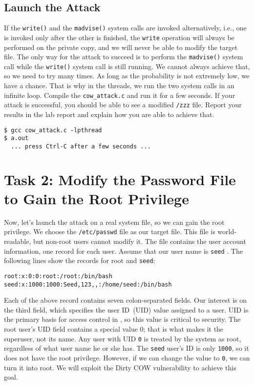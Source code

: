 \subsection{Launch the Attack}

If the \texttt{write()} and the \texttt{madvise()} system calls are invoked alternatively,
i.e., one is invoked only after the other is finished, the \texttt{write}
operation will always be performed on the private copy, and we will never be able to modify the
target file.  The only way for the attack to succeed is to perform the \texttt{madvise()}
system call while the \texttt{write()} system call is still running. We cannot always achieve
that, so we need to try many times. As long as the probability is not extremely low,
we have a chance. That is why in the threads, we run the two system calls in an infinite loop.
Compile the \texttt{cow\_attack.c}  and run it for a few seconds. If
your attack is successful, you should be able to see a modified \texttt{/zzz} file.
Report your results in the lab report and explain how you are able to
achieve that. 


\begin{lstlisting}
$ gcc cow_attack.c -lpthread
$ a.out
  ... press Ctrl-C after a few seconds ...
\end{lstlisting}



\section{Task 2: Modify the Password File to Gain the Root Privilege} 

Now, let's launch the attack on a real system file, so we can gain the root privilege.
We choose the \texttt{/etc/passwd} file as our target file. This file
is world-readable, but non-root users cannot modify it. The file contains
the user account information, one record for each user.  Assume that our user name is
\texttt{seed} . The following lines show the records for root and \texttt{seed}:

\begin{lstlisting}
root:x:0:0:root:/root:/bin/bash
seed:x:1000:1000:Seed,123,,:/home/seed:/bin/bash
\end{lstlisting}

Each of the above record contains seven colon-separated fields. Our interest is on the third
field, which specifies the user ID~(UID) value assigned to a user. UID is the primary
basis for access control in \linux, so this value is critical to security.
The root user's UID field contains a special value 0; that is what makes it the superuser,
not its name. Any user with UID \texttt{0} is treated by the system as root,
regardless of what user name he or she has.
The \texttt{seed} user's ID is only \texttt{1000}, so
it does not have the root privilege. However, if we can change the value to
\texttt{0}, we can turn it
into root. We will exploit the Dirty COW vulnerability to achieve this goal.

